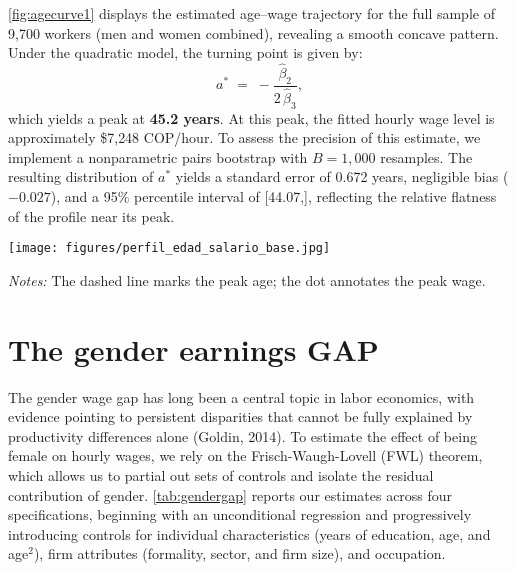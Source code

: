 \documentclass[12pt,a4paper,onecolumn]{article}
\begin{document}
\autoref{fig:agecurve1} displays the estimated age--wage trajectory for the full sample of 9{,}700 workers (men and women combined), revealing a smooth concave pattern. Under the quadratic model, the turning point is given by:
\[
a^\ast \;=\; -\frac{\widehat{\beta}_2}{2\,\widehat{\beta}_3},
\]
which yields a peak at \textbf{45.2 years}. At this peak, the fitted hourly wage level is approximately \$7{,}248 COP/hour. To assess the precision of this estimate, we implement a nonparametric pairs bootstrap with $B = 1{,}000$ resamples. The resulting distribution of $a^\ast$ yields a standard error of 0.672 years, negligible bias ($-0.027$), and a 95\% percentile interval of [44.07,], reflecting the relative flatness of the profile near its peak.


\begin{center}
  \captionsetup{type=figure,position=top}
  \label{fig:agecurve1}
\texttt{[image: figures/perfil\_edad\_salario\_base.jpg]}

  \caption*{\footnotesize \textit{Notes:} The dashed line marks the peak age; the dot annotates the peak wage.}
\end{center}


\section{The gender earnings GAP}

The gender wage gap has long been a central topic in labor economics, with evidence pointing to persistent disparities that cannot be fully explained by productivity differences alone (Goldin, 2014). To estimate the effect of being female on hourly wages, we rely on the Frisch-Waugh-Lovell (FWL) theorem, which allows us to partial out sets of controls and isolate the residual contribution of gender. \autoref{tab:gendergap} reports our estimates across four specifications, beginning with an unconditional regression and progressively introducing controls for individual characteristics (years of education, age, and age$^2$), firm attributes (formality, sector, and firm size), and occupation. 
\end{document}
